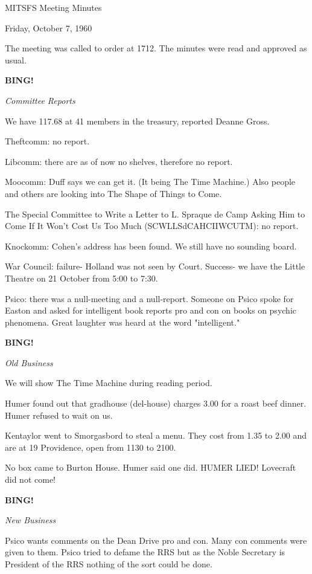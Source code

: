 \documentclass[12pt]{article}
\newcommand{\bing}{{\bf BING!} }
\newcommand{\goto}[1]{\bing \vskip 12pt \centerline{{\em{#1}}}}
\begin{document}
\begin{center}

MITSFS Meeting Minutes

Friday, October 7, 1960

\end{center}
 
\vspace{12pt}

\setlength{\parskip}{6pt}

\noindent
The meeting was called to order at 1712. The minutes were read and approved as usual.

\goto{Committee Reports}

We have 117.68 at 41 members in the treasury, reported Deanne Gross.

Theftcomm: no report.

Libcomm: there are as of now no shelves, therefore no report.

Moocomm: Duff says we can get it. (It being The Time Machine.) Also people and others are looking into The Shape of Things to Come.

The Special Committee to Write a Letter to L. Spraque de Camp Asking Him to Come If It Won't Cost Us Too Much (SCWLLSdCAHCIIWCUTM): no report.

Knockomm: Cohen's address has been found. We still have no sounding board.

War Council: failure- Holland was not seen by Court. Success- we have the Little Theatre on 21 October from 5:00 to 7:30.

Psico: there was a null-meeting and a null-report. Someone on Psico spoke for Easton and asked for intelligent book reports pro and con on books on psychic phenomena. Great laughter was heard at the word "intelligent."

\goto{Old Business}

We will show The Time Machine during reading period.

Humer found out that gradhouse (del-house) charges 3.00 for a roast beef dinner. Humer refused to wait on us.

Kentaylor went to Smorgasbord to steal a menu. They cost from 1.35 to 2.00 and are at 19 Providence, open from 1130 to 2100.

No box came to Burton House. Humer said one did. HUMER LIED! Lovecraft did not come!

\goto{New Business}

Psico wants comments on the Dean Drive pro and con. Many con comments were given to them. Psico tried to defame the RRS but as the Noble Secretary is President of the RRS nothing of the sort could be done.
\end{document}
